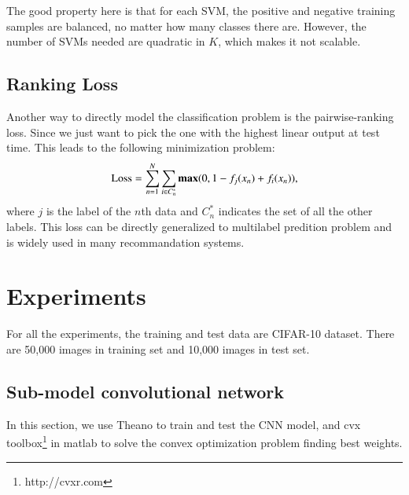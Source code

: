 \documentclass{article} %
\begin{document}
The good property here is that for each SVM, the positive and negative training samples are balanced, no matter how many classes there are. However, the number of SVMs needed are quadratic in $K$, which makes it not scalable.

\subsection{Ranking Loss}
Another way to directly model the classification problem is the pairwise-ranking loss. Since we just want to pick the one with the highest linear output at test time. This leads to the following minimization problem:
\begin{equation}
\textup{Loss} = \sum_{n=1}^{N}\sum_{i \in C_{n}^{*}}\textbf{max}(0, 1-f_{j}(x_{n})+f_{i}(x_{n})),
\end{equation}
where $j$ is the label of the $n$th data and $C_{n}^{*}$ indicates the set of all the other labels. This loss can be directly generalized to multilabel predition problem and is widely used in many recommandation systems. 



\section{Experiments}
For all the experiments, the training and test data are CIFAR-10 dataset. There are 50,000 images in training set and 10,000 images in test set.
\subsection{Sub-model convolutional network}
In this section, we use Theano\cite{theano} to train and test the CNN model, and cvx toolbox\footnote{http://cvxr.com} in matlab to solve the convex optimization problem finding best weights. 
\end{document}
